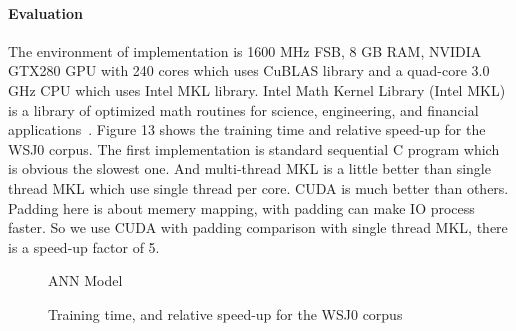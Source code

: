 \documentclass[11pt]{article}
\begin{document}
		\paragraph{Evaluation}
The environment of implementation is 1600 MHz FSB, 8 GB RAM, NVIDIA GTX280 GPU with 240 cores which uses CuBLAS library and a quad-core 3.0 GHz CPU which uses Intel MKL library. Intel Math Kernel Library (Intel MKL) is a library of optimized math routines for science, engineering, and financial applications~\cite{GM_wiki}. Figure 13 shows the training time and relative speed-up for the WSJ0 corpus. The first implementation is standard sequential C program which is obvious the slowest one. And multi-thread MKL is a little better than single thread MKL which use single thread per core. CUDA is much better than others. Padding here is about memery mapping, with padding can make IO process faster. So we use CUDA with padding comparison with single thread MKL, there is a speed-up factor of 5.

\begin{figure}[H]
\centering
\begin{minipage}{.5\textwidth}
  \centering
	\fbox{\texttt{[image: gm1]} } 
	\label{fig:gm1}
	\caption{ANN Model ~\cite{DP}}
\end{minipage}%
\begin{minipage}{.5\textwidth}
  \centering
	\fbox{\texttt{[image: gm2]} } 
	\label{table:gm2}
	\caption{Training time, and relative speed-up for the WSJ0 corpus ~\cite{DP}}
\end{minipage}
\end{figure}
	
	
	
	
	
\end{document}
